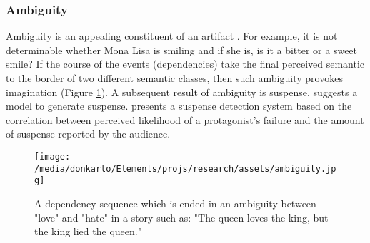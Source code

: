 \documentclass{article}
\begin{document}
	\subsubsection{Ambiguity}
	Ambiguity is an appealing constituent of an artifact \citep{muth-2015-the-appeal-of-challenge-in-the-perception-of-art-how-ambiguity-solvability-of-ambiguity-and-the-opportunity-for-insight-affect-appreciation}. For example, it is not determinable whether Mona Lisa is smiling and if she is, is it a bitter or a sweet smile? If the course of the events (dependencies) take the final perceived semantic to the border of two different semantic classes, then such ambiguity provokes imagination (Figure \ref{fig:ambiguity}). A subsequent result of ambiguity is suspense.
	\citet{cheong-2006-a-computational-model-of-narrative-generation-for-suspense} suggests a model to generate suspense. \citet{oneill-2011-toward-a-computational-framework-of-suspense-and-dramatic-arc} presents a suspense detection system based on the correlation between perceived likelihood of a protagonist’s failure and the amount of suspense reported by the audience.
	\begin{figure}[h!]
		\centering
		\texttt{[image: /media/donkarlo/Elements/projs/research/assets/ambiguity.jpg]}
		\caption{A dependency sequence which is ended in an ambiguity between "love" and "hate" in a story such as: "The queen loves the king, but the king lied the queen."} 
		\label{fig:ambiguity}
	\end{figure}
\end{document}
